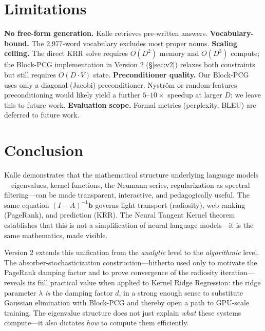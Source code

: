 \documentclass[11pt,a4paper]{article}
\begin{document}
\section{Limitations}

\textbf{No free-form generation.} Kalle retrieves pre-written answers.
\textbf{Vocabulary-bound.} The 2,977-word vocabulary excludes most proper nouns.
\textbf{Scaling ceiling.} The direct KRR solve requires $O(D^2)$ memory and $O(D^3)$ compute; the Block-PCG implementation in Version 2 (\S\ref{sec:v2}) relaxes both constraints but still requires $O(D \cdot V)$ state.
\textbf{Preconditioner quality.} Our Block-PCG uses only a diagonal (Jacobi) preconditioner. Nystr\"om or random-features preconditioning would likely yield a further $5$--$10\times$ speedup at larger $D$; we leave this to future work.
\textbf{Evaluation scope.} Formal metrics (perplexity, BLEU) are deferred to future work.


\section{Conclusion}

Kalle demonstrates that the mathematical structure underlying language models---eigenvalues, kernel functions, the Neumann series, regularization as spectral filtering---can be made transparent, interactive, and pedagogically useful. The same equation $(I - A)^{-1}\mathbf{b}$ governs light transport (radiosity), web ranking (PageRank), and prediction (KRR). The Neural Tangent Kernel theorem establishes that this is not a simplification of neural language models---it is the same mathematics, made visible.

Version 2 extends this unification from the \emph{analytic} level to the \emph{algorithmic} level. The absorber-stochasticization construction---hitherto used only to motivate the PageRank damping factor and to prove convergence of the radiosity iteration---reveals its full practical value when applied to Kernel Ridge Regression: the ridge parameter $\lambda$ \emph{is} the damping factor $d$, in a strong enough sense to substitute Gaussian elimination with Block-PCG and thereby open a path to GPU-scale training. The eigenvalue structure does not just explain \emph{what} these systems compute---it also dictates \emph{how} to compute them efficiently.
\end{document}
